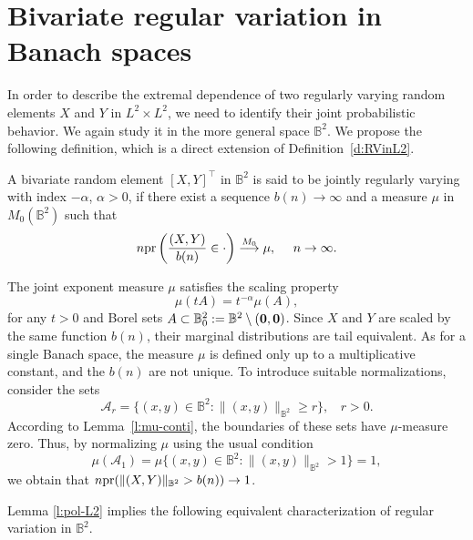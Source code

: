 \documentclass[lineno]{biometrika}
\newcommand \ag{\alpha}
\newcommand\bzero{\mbox{\boldmath${0}$}}
\newcommand\mbB{{\mathbb B}}
\newcommand\cA{{\mathcal A}}
\newcommand\lp{\left (}
\newcommand\rp{\right )}
\begin{document}
\section{Bivariate regular variation in Banach spaces} \label{s:BRV}
In order to describe the extremal dependence of two regularly varying random elements $X$ and $Y$ in $L^2 \times L^2$, we need to identify their joint probabilistic behavior. We again study it in the more general space $\mbB^2$. We propose the following definition, which is a direct extension of Definition~\ref{d:RVinL2}.

\begin{definition} \label{d:RVinL2L2}
A bivariate random element $[X,Y]^{\top
}$ in $\mbB^2$ is said to be jointly regularly varying with index $-\ag$, $\ag> 0$, if there exist a sequence $b(n) \to \infty$ and a measure $\mu$ in $M_0(\mbB^2)$ such that
\begin{equation} \label{eq:def-RVXY}
n{\rm pr} \lp \frac{(X,Y)}{b(n)}  \in \cdot \rp
\stackrel{M_0}{\longrightarrow} \mu, \ \ \ \ n \to \infty.
\end{equation}

\end{definition}

The joint exponent measure $\mu$ satisfies the scaling property
\begin{equation} \label{eq:mu-s}
\mu(tA) = t^{-\ag}\mu(A),
\end{equation}
for any $t>0$ and Borel sets $A \subset \mbB_0^2 := \mbB^2 \setminus (\bzero, \bzero)$. Since $X$ and $Y$ are scaled by the same function $b(n)$, their marginal distributions are tail equivalent. As for a single Banach space, the measure  $\mu$ is defined
only up to a multiplicative constant, and the $b(n)$ are not unique.
To introduce suitable normalizations, consider the sets
\begin{equation} \label{eq:A}
\mathcal A_r =\{(x,y)\in \mbB^2: \|(x,y)\|_{\mbB^2} \ge r\}, \ \ \ \ r>0.
\end{equation}
According to Lemma~\ref{l:mu-conti}, the boundaries of these sets have $\mu$-measure zero. Thus, by normalizing $\mu$ using the usual condition
\begin{equation} \label{eq:mu1}
\mu(\cA_1 )=\mu\{(x,y) \in \mbB^2: \|(x,y)\|_{\mbB^2} >1\}=1,
\end{equation}
we obtain that $n {\rm pr}(\|(X,Y)\|_{\mbB^2} >b(n)) \to 1$.


Lemma \ref{l:pol-L2} implies the following equivalent characterization of regular variation in $\mbB^2$.
\end{document}
